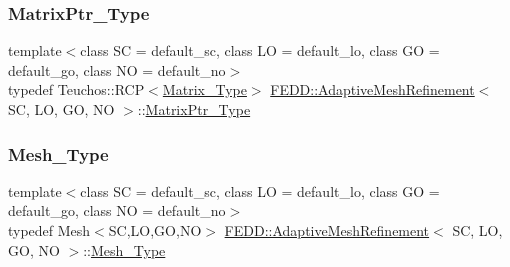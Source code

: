 \mbox{\label{classFEDD_1_1AdaptiveMeshRefinement_a862a72ab4878d57a61b746f5ac8d0b6c}} 
\subsubsection{\texorpdfstring{Matrix\+Ptr\+\_\+\+Type}{MatrixPtr\_Type}}
{\footnotesize\ttfamily template$<$class SC  = default\+\_\+sc, class LO  = default\+\_\+lo, class GO  = default\+\_\+go, class NO  = default\+\_\+no$>$ \\
typedef Teuchos\+::\+R\+CP$<$\hyperlink{classFEDD_1_1AdaptiveMeshRefinement_a607791df1d84bc4ea9fc08acd31225c7}{Matrix\+\_\+\+Type}$>$ \hyperlink{classFEDD_1_1AdaptiveMeshRefinement}{F\+E\+D\+D\+::\+Adaptive\+Mesh\+Refinement}$<$ SC, LO, GO, NO $>$\+::\hyperlink{classFEDD_1_1AdaptiveMeshRefinement_a862a72ab4878d57a61b746f5ac8d0b6c}{Matrix\+Ptr\+\_\+\+Type}}

\mbox{\label{classFEDD_1_1AdaptiveMeshRefinement_a7d24de886f92d012c43fbe13d884f08b}} 
\subsubsection{\texorpdfstring{Mesh\+\_\+\+Type}{Mesh\_Type}}
{\footnotesize\ttfamily template$<$class SC  = default\+\_\+sc, class LO  = default\+\_\+lo, class GO  = default\+\_\+go, class NO  = default\+\_\+no$>$ \\
typedef Mesh$<$SC,LO,GO,NO$>$ \hyperlink{classFEDD_1_1AdaptiveMeshRefinement}{F\+E\+D\+D\+::\+Adaptive\+Mesh\+Refinement}$<$ SC, LO, GO, NO $>$\+::\hyperlink{classFEDD_1_1AdaptiveMeshRefinement_a7d24de886f92d012c43fbe13d884f08b}{Mesh\+\_\+\+Type}}

\mbox{\label{classFEDD_1_1AdaptiveMeshRefinement_a2d24dca5502ca055019d31c569bf003e}} 
